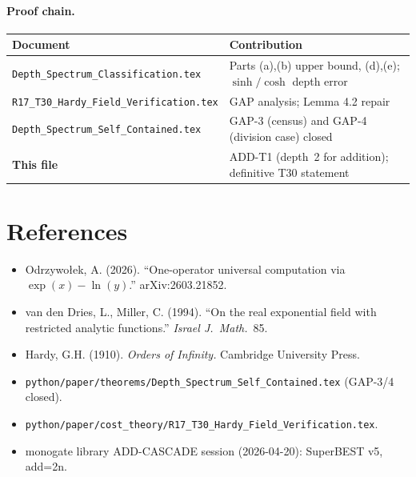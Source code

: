 \documentclass[12pt,a4paper]{article}
\theoremstyle{definition}
\theoremstyle{remark}
\begin{document}
\paragraph{Proof chain.}
\begin{center}
\begin{tabular}{@{}ll@{}}
\toprule
\textbf{Document} & \textbf{Contribution} \\
\midrule
\texttt{Depth\_Spectrum\_Classification.tex}
  & Parts (a),(b) upper bound, (d),(e); $\sinh/\cosh$ depth error \\
\texttt{R17\_T30\_Hardy\_Field\_Verification.tex}
  & GAP analysis; Lemma 4.2 repair \\
\texttt{Depth\_Spectrum\_Self\_Contained.tex}
  & GAP-3 (census) and GAP-4 (division case) closed \\
\textbf{This file}
  & ADD-T1 (depth~2 for addition); definitive T30 statement \\
\bottomrule
\end{tabular}
\end{center}

\section*{References}

\begin{itemize}
  \item Odrzywołek, A. (2026). ``One-operator universal computation via $\exp(x)-\ln(y)$.''
        arXiv:2603.21852.
  \item van den Dries, L., Miller, C. (1994). ``On the real exponential field
        with restricted analytic functions.'' \textit{Israel J.\ Math.}~85.
  \item Hardy, G.H. (1910). \textit{Orders of Infinity.} Cambridge University Press.
  \item \texttt{python/paper/theorems/Depth\_Spectrum\_Self\_Contained.tex} (GAP-3/4 closed).
  \item \texttt{python/paper/cost\_theory/R17\_T30\_Hardy\_Field\_Verification.tex}.
  \item monogate library ADD-CASCADE session (2026-04-20): SuperBEST v5, add=2n.
\end{itemize}
\end{document}
